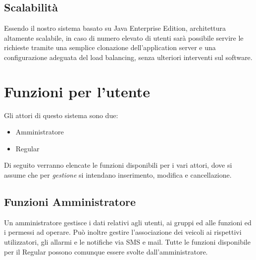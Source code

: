 \documentclass[a4paper,12pt]{article}
\begin{document}
\subsection{Scalabilità}
Essendo il nostro sistema basato su Java Enterprise Edition, architettura altamente scalabile, in caso di numero elevato di utenti sarà possibile servire le richieste tramite una semplice clonazione dell'application server e una configurazione adeguata del load balancing, senza ulteriori interventi sul software.
\pagebreak

\section{Funzioni per l'utente}
Gli attori di questo sistema sono due:
\begin{itemize}
\item Amministratore
\item Regular
\end{itemize}

Di seguito verranno elencate le funzioni disponibili per i vari attori, dove si assume che per \textit{gestione} si intendano inserimento, modifica e cancellazione.

\subsection{Funzioni Amministratore}
Un amministratore gestisce i dati relativi agli utenti, ai gruppi ed alle funzioni ed i permessi ad operare. Può inoltre gestire l'associazione dei veicoli ai rispettivi utilizzatori, gli allarmi e le notifiche via SMS e mail. Tutte le funzioni disponibile per il Regular possono comunque essere svolte dall'amministratore.
\begin{center}
\end{center}
\end{document}

